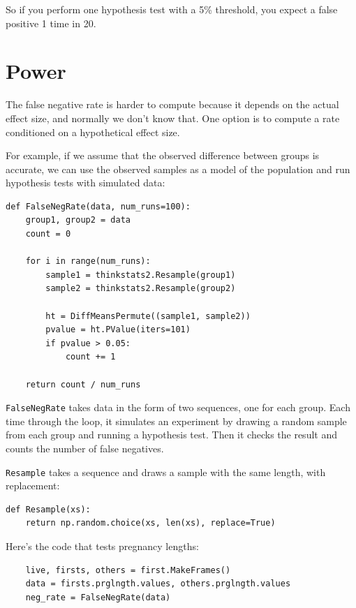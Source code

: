 \documentclass[12pt]{book}
\begin{document}
So if you perform one hypothesis test with a 5\% threshold, you expect
a false positive 1 time in 20.


\section{Power}
\label{power}

The false negative rate is harder to compute because it depends on
the actual effect size, and normally we don't know that.
One option is to compute a rate
conditioned on a hypothetical effect size.

For example, if we assume that the observed difference between groups
is accurate, we can use the observed samples as a model of the
population and run hypothesis tests with simulated data:

\begin{verbatim}
def FalseNegRate(data, num_runs=100):
    group1, group2 = data
    count = 0

    for i in range(num_runs):
        sample1 = thinkstats2.Resample(group1)
        sample2 = thinkstats2.Resample(group2)

        ht = DiffMeansPermute((sample1, sample2))
        pvalue = ht.PValue(iters=101)
        if pvalue > 0.05:
            count += 1

    return count / num_runs
\end{verbatim}

{\tt FalseNegRate} takes data in the form of two sequences, one for
each group.  Each time through the loop, it simulates an experiment by
drawing a random sample from each group and running a hypothesis test.
Then it checks the result and counts the number of false negatives.

{\tt Resample} takes a sequence and draws a sample with the same
length, with replacement:

\begin{verbatim}
def Resample(xs):
    return np.random.choice(xs, len(xs), replace=True)
\end{verbatim}

Here's the code that tests pregnancy lengths:

\begin{verbatim}
    live, firsts, others = first.MakeFrames()
    data = firsts.prglngth.values, others.prglngth.values
    neg_rate = FalseNegRate(data)
\end{verbatim}
\end{document}
